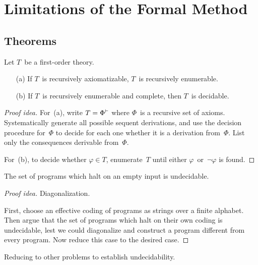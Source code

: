 %
%
\section{Limitations of the Formal Method}
\subsection*{Theorems}
\begin{lem}
Let \(T\)~be a first-order theory.
\begin{enumerate}[itemsep=0pt]
\item[(a)] If \(T\)~is recursively axiomatizable, \(T\)~is recursively enumerable.
\item[(b)] If \(T\)~is recursively enumerable and complete, then \(T\)~is decidable.
\end{enumerate}
\end{lem}
\begin{proof}[Proof idea]
For~(a), write \(T=\Phi^{\vdash}\) where \(\Phi\)~is a recursive set of axioms. Systematically generate all possible sequent derivations, and use the decision procedure for~\(\Phi\) to decide for each one whether it is a derivation from~\(\Phi\). List only the consequences derivable from~\(\Phi\).

For~(b), to decide whether \(\varphi\in T\), enumerate~\(T\) until either \(\varphi\)~or~\(\lnot\varphi\) is found.
\end{proof}

\begin{thm}
The set of programs which halt on an empty input is undecidable.
\end{thm}
\begin{proof}[Proof idea]
Diagonalization.

First, choose an effective coding of programs as strings over a finite alphabet. Then argue that the set of programs which halt on their own coding is undecidable, lest we could diagonalize and construct a program different from every program. Now reduce this case to the desired case.
\end{proof}
\begin{app}
Reducing to other problems to establish undecidability.
\end{app}

